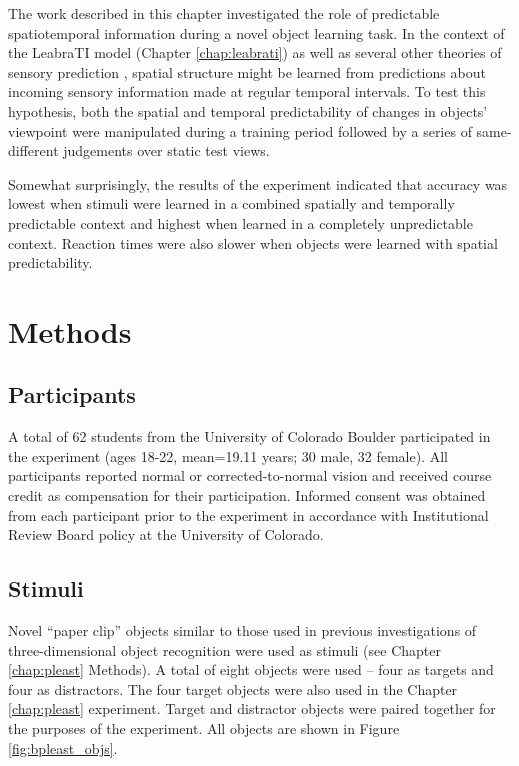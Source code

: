 \documentclass[dwyatte_dissertation.tex]{subfiles}
\begin{document}
The work described in this chapter investigated the role of predictable spatiotemporal information during a novel object learning task. In the context of the LeabraTI model (Chapter \ref{chap:leabrati}) as well as several other theories of sensory prediction \cite{ArnalGiraud12,GiraudPoeppel12}, spatial structure might be learned from predictions about incoming sensory information made at regular temporal intervals. To test this hypothesis, both the spatial and temporal predictability of changes in objects' viewpoint were manipulated during a training period followed by a series of same-different judgements over static test views.

Somewhat surprisingly, the results of the experiment indicated that accuracy was lowest when stimuli were learned in a combined spatially and temporally predictable context and highest when learned in a completely unpredictable context. Reaction times were also slower when objects were learned with spatial predictability.

\section{Methods}

\subsection{Participants}
A total of 62 students from the University of Colorado Boulder participated in the experiment (ages 18-22, mean=19.11 years; 30 male, 32 female). All participants reported normal or corrected-to-normal vision and received course credit as	compensation for their participation. Informed consent was obtained from each participant prior to the experiment in accordance with Institutional Review Board policy at the University of Colorado.

\subsection{Stimuli}
Novel ``paper clip'' objects similar to those used in previous investigations of three-dimensional object recognition \cite{BulthoffEdelman92,EdelmanBulthoff92,LogothetisPaulsBulthoffEtAl94,LogothetisPaulsPoggio95,SinhaPoggio96} were used as stimuli (see Chapter \ref{chap:pleast} Methods). A total of eight objects were used -- four as targets and four as distractors. The four target objects were also used in the Chapter \ref{chap:pleast} experiment. Target and distractor objects were paired together for the purposes of the experiment. All objects are shown in Figure \ref{fig:bpleast_objs}.
\end{document}
